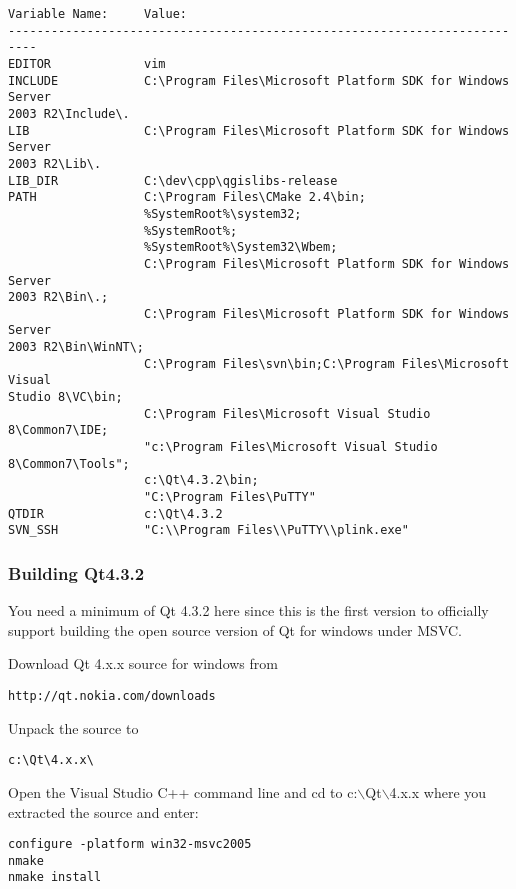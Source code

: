 \begin{verbatim}
Variable Name:     Value:
--------------------------------------------------------------------------
EDITOR             vim
INCLUDE            C:\Program Files\Microsoft Platform SDK for Windows Server 
2003 R2\Include\.
LIB                C:\Program Files\Microsoft Platform SDK for Windows Server 
2003 R2\Lib\.
LIB_DIR            C:\dev\cpp\qgislibs-release
PATH               C:\Program Files\CMake 2.4\bin;
                   %SystemRoot%\system32;
                   %SystemRoot%;
                   %SystemRoot%\System32\Wbem;
                   C:\Program Files\Microsoft Platform SDK for Windows Server 
2003 R2\Bin\.;
                   C:\Program Files\Microsoft Platform SDK for Windows Server 
2003 R2\Bin\WinNT\;
                   C:\Program Files\svn\bin;C:\Program Files\Microsoft Visual 
Studio 8\VC\bin;
                   C:\Program Files\Microsoft Visual Studio 8\Common7\IDE;
                   "c:\Program Files\Microsoft Visual Studio 8\Common7\Tools";
                   c:\Qt\4.3.2\bin;
                   "C:\Program Files\PuTTY"
QTDIR              c:\Qt\4.3.2
SVN_SSH            "C:\\Program Files\\PuTTY\\plink.exe"
\end{verbatim}

\hypertarget{toc98}{}
\subsubsection{Building Qt4.3.2}
You need a minimum of Qt 4.3.2 here since this is the first version to officially 
support building the open source version of Qt for windows under MSVC.

Download Qt 4.x.x source for windows from

\begin{verbatim}
http://qt.nokia.com/downloads
\end{verbatim}

Unpack the source to 

\begin{verbatim}
c:\Qt\4.x.x\
\end{verbatim}

\hypertarget{toc99}{}
Open the Visual Studio C++ command line and cd to c:$\backslash$Qt$\backslash$4.x.x where you
extracted the source and enter:

\begin{verbatim}
configure -platform win32-msvc2005
nmake
nmake install
\end{verbatim}

